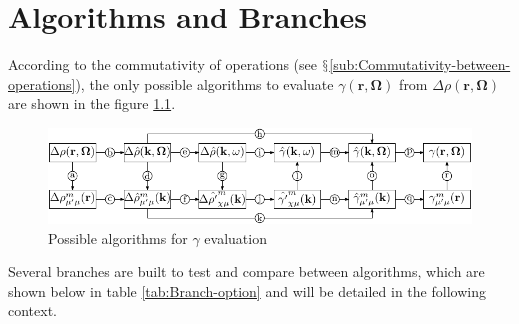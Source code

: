 
\chapter{Algorithms and Branches\label{chpt:algorithms-and-branches}}

According to the commutativity of operations (see $\mathsection$\ref{sub:Commutativity-between-operations}),
the only possible algorithms to evaluate $\gamma(\mathbf{r},\mathbf{\Omega})$
from $\Delta\rho(\mathbf{r},\mathbf{\Omega})$ are shown in the figure
\ref{fig:Possible-algorithms}.

\begin{figure}[h]
\begin{centering}
\includegraphics{_figure/algorithms}
\par\end{centering}

\caption{Possible algorithms for $\gamma$ evaluation\label{fig:Possible-algorithms}}
\end{figure}


Several branches are built to test and compare between algorithms,
which are shown below in table \ref{tab:Branch-option} and will be
detailed in the following context. 

